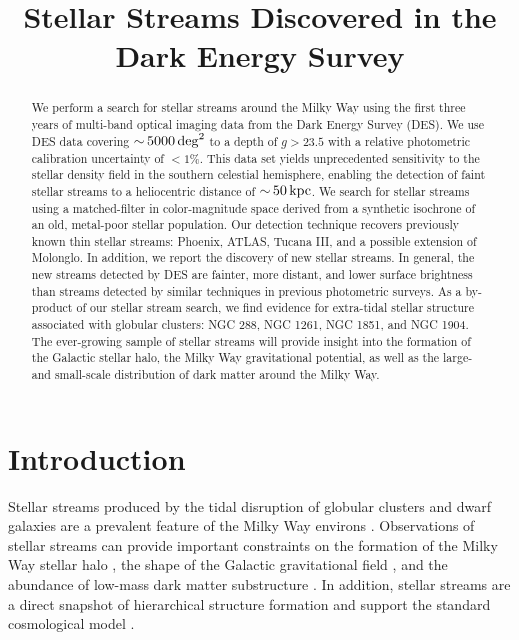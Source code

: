 \documentclass[twocolumn]{aastex61}
\begin{document}
\title{Stellar Streams Discovered in the Dark Energy Survey}



\begin{abstract}

We perform a search for stellar streams around the Milky Way using the first three years of multi-band optical imaging data from the Dark Energy Survey (DES). 
We use DES data covering $ {\sim}\, 5000 \deg^2$ to a depth of $g > 23.5$ with a relative photometric calibration uncertainty of $< 1\%$. 
This data set yields unprecedented sensitivity to the stellar density field in the southern celestial hemisphere, enabling the detection of faint stellar streams to a heliocentric distance of $ {\sim}\, 50 \mathrm{\,kpc}$.
We search for stellar streams using a matched-filter in color-magnitude space derived from a synthetic isochrone of an old, metal-poor stellar population.
Our detection technique recovers \NKNOWN previously known thin stellar streams: Phoenix, ATLAS, Tucana III, and a possible extension of Molonglo. 
In addition, we report the discovery of \NSTREAMS new stellar streams.
In general, the new streams detected by DES are fainter, more distant, and lower surface brightness than streams detected by similar techniques in previous photometric surveys.
As a by-product of our stellar stream search, we find evidence for extra-tidal stellar structure associated with \NGLOB globular clusters: NGC 288, NGC 1261, NGC 1851, and NGC 1904.
The ever-growing sample of stellar streams will provide insight into the formation of the Galactic stellar halo, the Milky Way gravitational potential, as well as the large- and small-scale distribution of dark matter around the Milky Way.
\end{abstract}


\section{Introduction}
\label{sec:intro}

Stellar streams produced by the tidal disruption of globular clusters and dwarf galaxies are a prevalent feature of the Milky Way environs \citep[see][for a recent review]{Newberg:2016}.
Observations of stellar streams can provide important constraints on the formation of the Milky Way stellar halo \citep[e.g.,][]{Johnston:1998,Bullock:2005,Bell:2008}, the shape of the Galactic gravitational field \citep[e.g.,][]{Johnston:2005,Koposov:2010,Law:2010,Bovy:2014,Bonaca:2014,Gibbons:2014,Price-Whelan:2014,Sanders:2014,Bowden:2015,Kupper:2015,Erkal:2016,Bovy:2016}, and the abundance of low-mass dark matter substructure \citep[e.g.,][]{Ibata:2002,Johnston:2002,Carlberg:2009,Yoon:2011,Carlberg:2012,Ngan:2014,Erkal:2015,Carlberg:2016a,Sanderson:2016,Sanders:2016,Bovy:2017,Erkal:2017,Sandford:2017}.
In addition, stellar streams are a direct snapshot of hierarchical structure formation \citep{Peebles:1965,Press:1974,Blumenthal:1984} and support the standard \LCDM cosmological model \citep{Diemand:2008,Springel:2008}.
\end{document}
